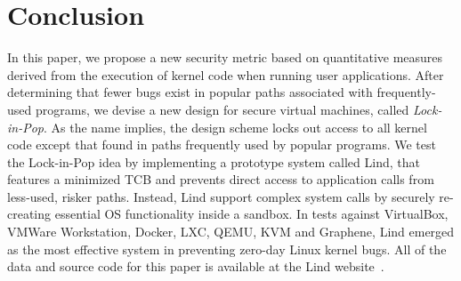 \section{Conclusion}
\label{sec.conclusion}

In this paper, we propose a new security metric based on quantitative measures derived from
the execution of kernel code when running user applications.
After determining that fewer bugs exist in popular paths associated with frequently-used
programs, we devise a new design for secure virtual machines, called \emph{Lock-in-Pop}.
As the name implies, the design scheme locks out access to all
kernel code except that found in paths frequently used by
popular programs. We test the Lock-in-Pop idea by implementing a prototype system
called Lind, that features a minimized TCB and prevents direct access to application
calls from less-used, risker paths.
Instead, Lind support complex system calls by securely re-creating
essential OS functionality inside a sandbox.
In tests against VirtualBox, VMWare Workstation, Docker, LXC,
QEMU, KVM and Graphene, Lind emerged as the most effective system in preventing
zero-day Linux kernel bugs.
All of the data and source code for this paper is available at the Lind website~\cite{Lind}.
